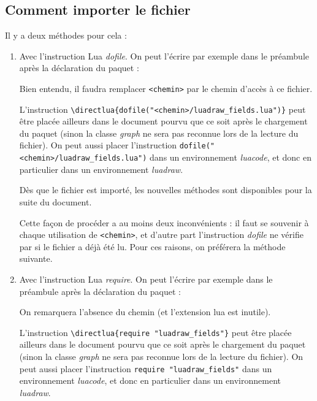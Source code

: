 \subsection{Comment importer le fichier}

Il y a deux méthodes pour cela :

\begin{enumerate}
    \item Avec l'instruction Lua \emph{dofile}. On peut l'écrire par exemple dans le préambule après la déclaration du paquet :
    \begin{TeXcode}
    \usepackage[]{luadraw}
    \end{TeXcode}
    Bien entendu, il faudra remplacer \verb|<chemin>| par le chemin d'accès à ce fichier. 
    
    L'instruction \verb|\directlua{dofile("<chemin>/luadraw_fields.lua")}| peut être placée ailleurs dans le document pourvu que ce soit après le chargement du paquet (sinon la classe \emph{graph} ne sera pas reconnue lors de la lecture du fichier). On peut aussi placer l'instruction \verb|dofile("<chemin>/luadraw_fields.lua")| dans un environnement \emph{luacode}, et donc en particulier dans un environnement \emph{luadraw}.
    
    Dès que le fichier est importé, les nouvelles méthodes sont disponibles pour la suite du document.
    
    Cette façon de procéder a au moins deux inconvénients : il faut se souvenir à chaque utilisation de \verb|<chemin>|, et d'autre part l'instruction \emph{dofile} ne vérifie par si le fichier a déjà été lu. Pour ces raisons, on préférera la méthode suivante.
    
    \item Avec l'instruction Lua \emph{require}. On peut l'écrire par exemple dans le préambule après la déclaration du paquet :
    \begin{TeXcode}
    \usepackage[]{luadraw}
    \end{TeXcode}
    On remarquera l'absence du chemin (et l'extension lua est inutile).
    
    L'instruction \verb|\directlua{require "luadraw_fields"}| peut être placée ailleurs dans le document pourvu que ce soit après le chargement du paquet (sinon la classe \emph{graph} ne sera pas reconnue lors de la lecture du fichier). On peut aussi placer l'instruction \verb|require "luadraw_fields"| dans un environnement \emph{luacode}, et donc en particulier dans un environnement \emph{luadraw}.
    

\end{enumerate}
